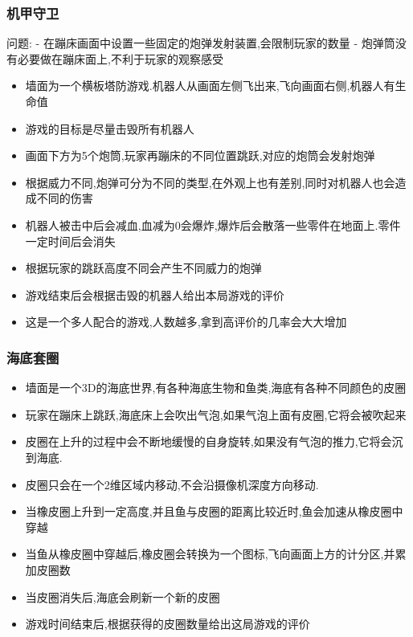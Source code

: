 \documentclass[11pt]{article}
\providecommand{\tightlist}{%
      \setlength{\itemsep}{0pt}\setlength{\parskip}{0pt}}
\begin{document}
    

    \subsubsection{机甲守卫}\label{ux673aux7532ux5b88ux536b}

    问题: - 在蹦床画面中设置一些固定的炮弹发射装置,会限制玩家的数量 -
炮弹筒没有必要做在蹦床面上,不利于玩家的观察感受

    \begin{itemize}
\tightlist
\item
  墙面为一个横板塔防游戏.机器人从画面左侧飞出来,飞向画面右侧,机器人有生命值
\item
  游戏的目标是尽量击毁所有机器人
\item
  画面下方为5个炮筒,玩家再蹦床的不同位置跳跃,对应的炮筒会发射炮弹
\item
  根据威力不同,炮弹可分为不同的类型,在外观上也有差别,同时对机器人也会造成不同的伤害
\item
  机器人被击中后会减血,血减为0会爆炸,爆炸后会散落一些零件在地面上.零件一定时间后会消失
\item
  根据玩家的跳跃高度不同会产生不同威力的炮弹
\item
  游戏结束后会根据击毁的机器人给出本局游戏的评价
\item
  这是一个多人配合的游戏,人数越多,拿到高评价的几率会大大增加
\end{itemize}

    

    \subsubsection{海底套圈}\label{ux6d77ux5e95ux5957ux5708}

    \begin{itemize}
\tightlist
\item
  墙面是一个3D的海底世界,有各种海底生物和鱼类,海底有各种不同颜色的皮圈
\item
  玩家在蹦床上跳跃,海底床上会吹出气泡,如果气泡上面有皮圈,它将会被吹起来
\item
  皮圈在上升的过程中会不断地缓慢的自身旋转,如果没有气泡的推力,它将会沉到海底.
\item
  皮圈只会在一个2维区域内移动,不会沿摄像机深度方向移动.
\item
  当橡皮圈上升到一定高度,并且鱼与皮圈的距离比较近时,鱼会加速从橡皮圈中穿越
\item
  当鱼从橡皮圈中穿越后,橡皮圈会转换为一个图标,飞向画面上方的计分区,并累加皮圈数
\item
  当皮圈消失后,海底会刷新一个新的皮圈
\item
  游戏时间结束后,根据获得的皮圈数量给出这局游戏的评价
\end{itemize}
\end{document}

